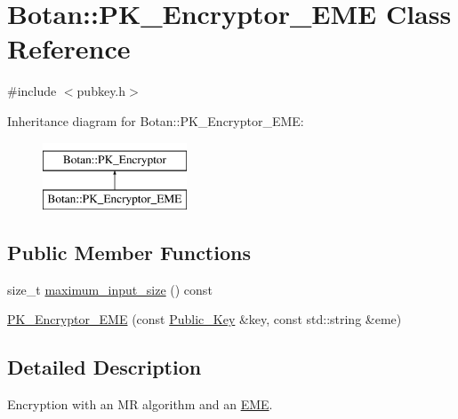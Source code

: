 \hypertarget{classBotan_1_1PK__Encryptor__EME}{\section{Botan\-:\-:P\-K\-\_\-\-Encryptor\-\_\-\-E\-M\-E Class Reference}
\label{classBotan_1_1PK__Encryptor__EME}
}


{\ttfamily \#include $<$pubkey.\-h$>$}

Inheritance diagram for Botan\-:\-:P\-K\-\_\-\-Encryptor\-\_\-\-E\-M\-E\-:\begin{figure}[H]
\begin{center}
\leavevmode
\includegraphics[height=2.000000cm]{classBotan_1_1PK__Encryptor__EME}
\end{center}
\end{figure}
\subsection*{Public Member Functions}
\begin{DoxyCompactItemize}
\item 
size\-\_\-t \hyperlink{classBotan_1_1PK__Encryptor__EME_ad0c6948c9a2e6001564213c1b8ee39c9}{maximum\-\_\-input\-\_\-size} () const 
\item 
\hyperlink{classBotan_1_1PK__Encryptor__EME_a0a0cd434c7a258a27e322617cc440bbd}{P\-K\-\_\-\-Encryptor\-\_\-\-E\-M\-E} (const \hyperlink{classBotan_1_1Public__Key}{Public\-\_\-\-Key} \&key, const std\-::string \&eme)
\end{DoxyCompactItemize}


\subsection{Detailed Description}
Encryption with an M\-R algorithm and an \hyperlink{classBotan_1_1EME}{E\-M\-E}. 

